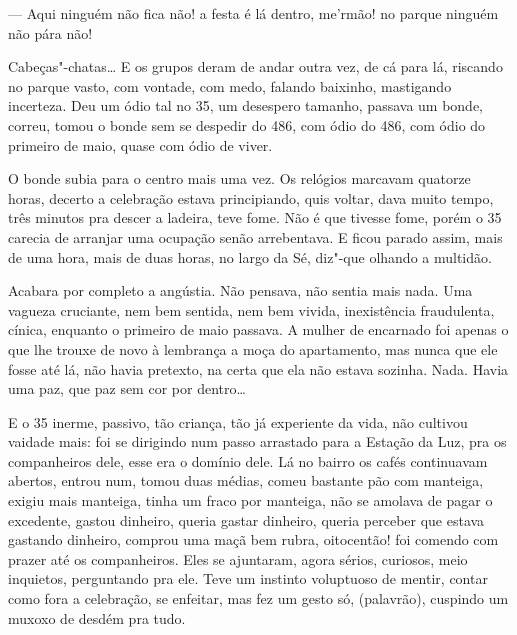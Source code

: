 --- Aqui ninguém não fica não! a festa é lá dentro, me'rmão! no parque
ninguém não pára não!

Cabeças"-chatas\ldots{} E os grupos deram de andar outra vez, de cá para lá,
riscando no parque vasto, com vontade, com medo, falando baixinho,
mastigando incerteza. Deu um ódio tal no 35, um desespero tamanho,
passava um bonde, correu, tomou o bonde sem se despedir do 486, com ódio
do 486, com ódio do primeiro de maio, quase com ódio de viver.

O bonde subia para o centro mais uma vez. Os relógios marcavam quatorze
horas, decerto a celebração estava principiando, quis voltar, dava muito
tempo, três minutos pra descer a ladeira, teve fome. Não é que tivesse
fome, porém o 35 carecia de arranjar uma ocupação senão arrebentava. E
ficou parado assim, mais de uma hora, mais de duas horas, no largo da
Sé, diz"-que olhando a multidão.

Acabara por completo a angústia. Não pensava, não sentia mais nada. Uma
vagueza cruciante, nem bem sentida, nem bem vivida, inexistência
fraudulenta, cínica, enquanto o primeiro de maio passava. A mulher de
encarnado foi apenas o que lhe trouxe de novo à lembrança a moça do
apartamento, mas nunca que ele fosse até lá, não havia pretexto, na
certa que ela não estava sozinha. Nada. Havia uma paz, que paz sem cor
por dentro\ldots{}


E o 35 inerme, passivo, tão criança, tão já experiente da vida, não
cultivou vaidade mais: foi se dirigindo num passo arrastado para a
Estação da Luz, pra os companheiros dele, esse era o domínio dele. Lá no
bairro os cafés continuavam abertos, entrou num, tomou duas médias,
comeu bastante pão com manteiga, exigiu mais manteiga, tinha um fraco
por manteiga, não se amolava de pagar o excedente, gastou dinheiro,
queria gastar dinheiro, queria perceber que estava gastando dinheiro,
comprou uma maçã bem rubra, oitocentão! foi comendo com prazer até os
companheiros. Eles se ajuntaram, agora sérios, curiosos, meio inquietos,
perguntando pra ele. Teve um instinto voluptuoso de mentir, contar como
fora a celebração, se enfeitar, mas fez um gesto só, (palavrão),
cuspindo um muxoxo de desdém pra tudo.

